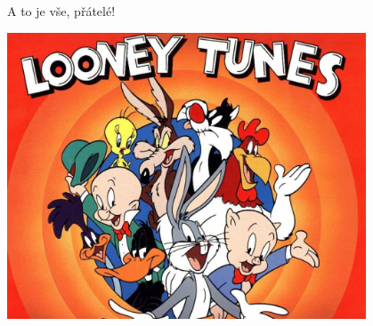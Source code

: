 \documentclass{beamer}
\begin{document}
\begin{frame}{A to je vše, přátelé!}
  \begin{center}
    \includegraphics[width=0.8\textwidth]{looney_tunes}
  \end{center}
\end{frame}
\end{document}
